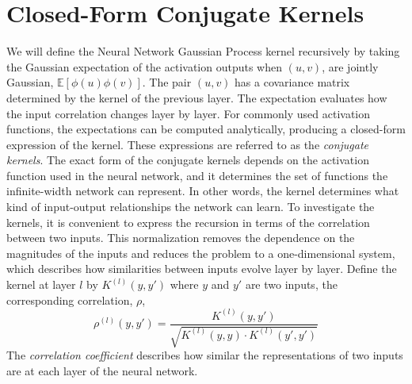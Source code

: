 \documentclass{article}
\newcommand{\NL}{\newline 
\newline}
\newcommand{\EX}{\mathbb{E}}
\begin{document}
\section{Closed-Form Conjugate Kernels}
We will define the Neural Network Gaussian Process kernel recursively by taking the Gaussian expectation of the activation outputs when $(u,v)$, are jointly Gaussian, $\EX[\phi(u)\phi(v)]$. The pair $(u,v)$ has a covariance matrix determined by the kernel of the previous layer. The expectation evaluates how the input correlation changes layer by layer.
\NL
For commonly used activation functions, the expectations can be computed analytically, producing a closed-form expression of the kernel. These expressions are referred to as the \textit{conjugate kernels}. The exact form of the conjugate kernels depends on the activation function used in the neural network, and it determines the set of functions the infinite-width network can represent. In other words, the kernel determines what kind of input-output relationships the network can learn.
\NL
To investigate the kernels, it is convenient to express the recursion in terms of the correlation between two inputs. This normalization removes the dependence on the magnitudes of the inputs and reduces the problem to a one-dimensional system, which describes how similarities between inputs evolve layer by layer. Define the kernel at layer $l$ by $K^{(l)}(y,y')$ where $y$ and $y'$ are two inputs, the corresponding correlation, $\rho$, 
$$\rho^{(l)}(y,y')=\frac{K^{(l)}(y,y')}{\sqrt{K^{(l)}(y,y)\cdot K^{(l)}(y',y')}}$$
The \textit{correlation coefficient} describes how similar the representations of two inputs are at each layer of the neural network.
\end{document}
